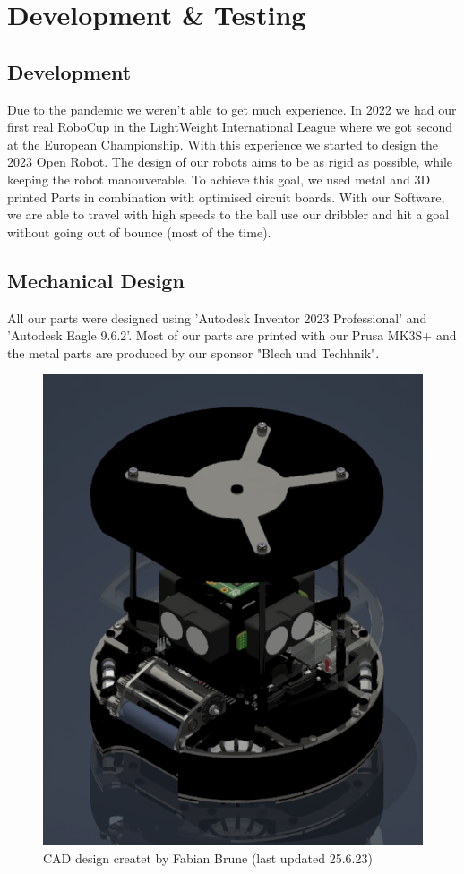 \documentclass{scrartcl}
\begin{document}
\section{Development \& Testing}

\subsection{Development}
Due to the pandemic we weren't able to get much experience. In 2022 we had our first real RoboCup
in the LightWeight International League where we got second at the European Championship. With this experience we started to design the 2023 Open Robot.
\newline
The design of our robots aims to be as rigid as possible, while keeping the robot manouverable.
To achieve this goal, we used metal and 3D printed Parts in combination with optimised circuit boards.
With our Software, we are able to travel with high speeds to the ball use our dribbler and
hit a goal without going out of bounce (most of the time).


\subsection{Mechanical Design}
All our parts were designed using 'Autodesk Inventor 2023 Professional' and 'Autodesk Eagle 9.6.2'.
Most of our parts are printed with our Prusa MK3S+ and the metal parts are produced
by our sponsor "Blech und Techhnik".

\begin{figure}[h]
    \centering
    \includegraphics[width=\textwidth]{img/Roboter Home.png}
    \caption{CAD design createt by Fabian Brune (last updated 25.6.23)}
    \label{fig:roboter}
\end{figure}
\end{document}
